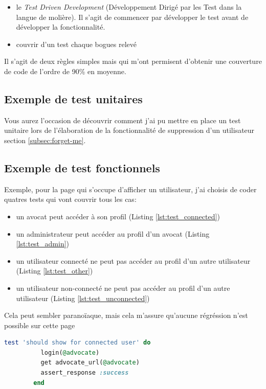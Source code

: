\documentclass[]{report}
\begin{document}
    \begin{itemize}
      \item le \textit{Test Driven Development} (Développement Dirigé par les Test dans la langue de molière). Il s'agit de commencer par développer le test avant de développer la fonctionnalité.
      \item couvrir d'un test chaque bogues relevé
    \end{itemize}

    Il s'agit de deux règles simples mais qui m'ont permisent d'obtenir une couverture de code de l'ordre de 90\% en moyenne.

    \subsection{Exemple de test unitaires}

      Vous aurez l'occasion de découvrir comment j'ai pu mettre en place un test unitaire lors de l'élaboration de la fonctionnalité de suppression d'un utilisateur section \ref{subsec:forget-me}.

    \subsection{Exemple de test fonctionnels}

      Exemple, pour la page qui s'occupe d'afficher un utilisateur, j'ai choisis de coder quatres tests qui vont couvrir tous les cas:

      \begin{itemize}
        \item un avocat peut accéder à son profil (Listing \ref{lst:test_connected})
        \item un administrateur peut accéder au profil d'un avocat (Listing \ref{lst:test_admin})
        \item un utilisateur connecté ne peut pas accéder au profil d'un autre utilisateur (Listing \ref{lst:test_other})
        \item un utilisateur non-connecté ne peut pas accéder au profil d'un autre utilisateur (Listing \ref{lst:test_unconnected})
      \end{itemize}

      Cela peut sembler paranoïaque, mais cela m'assure qu'aucune régréssion n'est possible sur cette page

      \begin{scriptsize}
        \begin{lstlisting}[language=ruby, caption={Test qu'un avocat peut accéder à son profil}, label={lst:test_connected}]
        test 'should show for connected user' do
          login(@advocate)
          get advocate_url(@advocate)
          assert_response :success
        end
        \end{lstlisting}
      \end{scriptsize}
\end{document}

